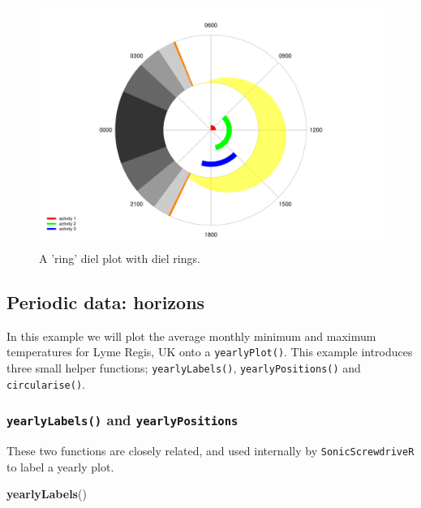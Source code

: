 \documentclass[
]{book}
\newenvironment{Shaded}{\begin{snugshade}}{\end{snugshade}}
\newcommand{\FunctionTok}[1]{\textcolor[rgb]{0.13,0.29,0.53}{\textbf{#1}}}
\newcommand{\NormalTok}[1]{#1}
\begin{document}
\begin{figure}

{\centering \includegraphics[width=0.9\linewidth]{_main_files/figure-latex/diel-plot-rings-2-1} 

}

\caption{A 'ring' diel plot with diel rings.}\label{fig:diel-plot-rings-2}
\end{figure}

\hypertarget{periodic-data-horizons}{%
\subsection{Periodic data: horizons}\label{periodic-data-horizons}}

In this example we will plot the average monthly minimum and maximum temperatures for Lyme Regis, UK onto a \texttt{yearlyPlot()}. This example introduces three small helper functions; \texttt{yearlyLabels()}, \texttt{yearlyPositions()} and \texttt{circularise()}.

\hypertarget{yearlylabels-and-yearlypositions}{%
\subsubsection{\texorpdfstring{\texttt{yearlyLabels()} and \texttt{yearlyPositions}}{yearlyLabels() and yearlyPositions}}\label{yearlylabels-and-yearlypositions}}

These two functions are closely related, and used internally by \texttt{SonicScrewdriveR} to label a yearly plot.

\begin{Shaded}
\begin{Highlighting}[]
\FunctionTok{yearlyLabels}\NormalTok{()}
\end{Highlighting}
\end{Shaded}
\end{document}
